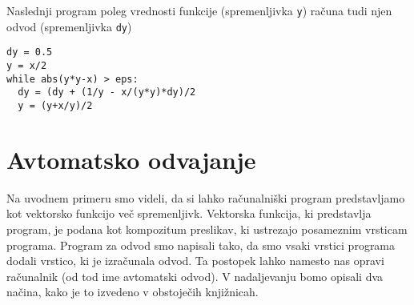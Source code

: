 \documentclass{article}
\begin{document}
Naslednji program poleg vrednosti funkcije (spremenljivka \texttt{y}) računa
tudi njen odvod (spremenljivka \texttt{dy})
\begin{verbatim}
dy = 0.5
y = x/2
while abs(y*y-x) > eps:
  dy = (dy + (1/y - x/(y*y)*dy)/2
  y = (y+x/y)/2
\end{verbatim}

\section{Avtomatsko odvajanje}
Na uvodnem primeru smo videli, da si lahko računalniški program predstavljamo
kot vektorsko funkcijo več spremenljivk. Vektorska funkcija, ki predstavlja
program, je podana kot kompozitum preslikav, ki ustrezajo posameznim vrsticam
programa. Program za odvod smo napisali tako, da smo vsaki vrstici
programa dodali vrstico, ki je izračunala odvod. Ta postopek lahko namesto nas
opravi računalnik (od tod ime avtomatski odvod). V nadaljevanju bomo opisali dva
načina, kako je to izvedeno v obstoječih knjižnicah. 
\end{document}
